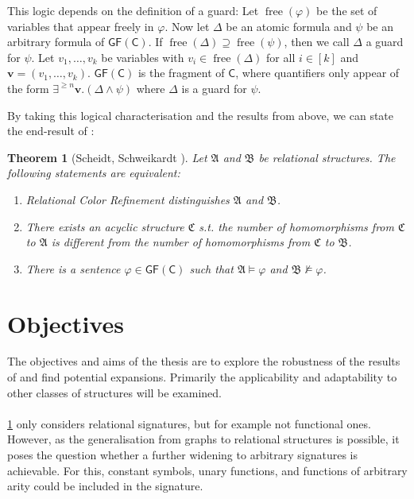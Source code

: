 \documentclass[a4paper,11pt,DIV=15]{scrartcl} %
\theoremstyle{plain}
\newtheorem{theorem}{Theorem}
\theoremstyle{definition}
\begin{document}
This logic depends on the definition of a guard: 
Let $\operatorname{free}(\varphi)$ be the set of variables that appear freely in $\varphi$.
Now let $\Delta$ be an atomic formula and $\psi$ be an arbitrary formula of $\mathsf{GF}(\mathsf C)$.
If $\operatorname{free}(\Delta)\supseteq\operatorname{free}(\psi)$, then we call $\Delta$ a guard for $\psi$.
Let $v_1,\dots,v_k$ be variables with $v_i\in \operatorname{free}(\Delta)$ for all $i\in[k]$ and $\mathbf v = (v_1,\dots,v_k)$.
$\mathsf{GF}(\mathsf C)$ is the fragment of $\mathsf C$, where quantifiers only appear of the form $\exists^{\geq n}\mathbf v.(\Delta \land \psi)$ where $\Delta$ is a guard for $\psi$.

By taking this logical characterisation and the results from above, we can state the end-result of \cite{scheidt2024color}:

\begin{theorem}[Scheidt, Schweikardt \cite{scheidt2024color}]
	Let $\mathfrak A$ and $\mathfrak B$ be relational structures. The following statements are equivalent:
	\begin{enumerate}
		\item Relational Color Refinement distinguishes $\mathfrak A$ and $\mathfrak B$.
		\item There exists an acyclic structure $\mathfrak C$ s.t. the number of homomorphisms from $\mathfrak C$ to $\mathfrak A$ is different from the number of homomorphisms from $\mathfrak C$ to $\mathfrak B$.
		\item There is a sentence $\varphi\in \mathsf{GF}(\mathsf C)$ such that $\mathfrak A\models\varphi$ and $\mathfrak B\not\models\varphi$.
	\end{enumerate}
	\label{RCRMainThm}
\end{theorem}

\section{Objectives}
\label{Sec::Objectives}

The objectives and aims of the thesis are to explore the robustness of the results of \cite{scheidt2024color} and find potential expansions. 
Primarily the applicability and adaptability to other classes of structures will be examined.
\\ \\
\cref{RCRMainThm} only considers relational signatures, but for example not functional ones.
However, as the generalisation from graphs to relational structures is possible, it poses the question whether a further widening to arbitrary signatures is achievable.
For this, constant symbols, unary functions, and functions of arbitrary arity could be included in the signature.
\end{document}
